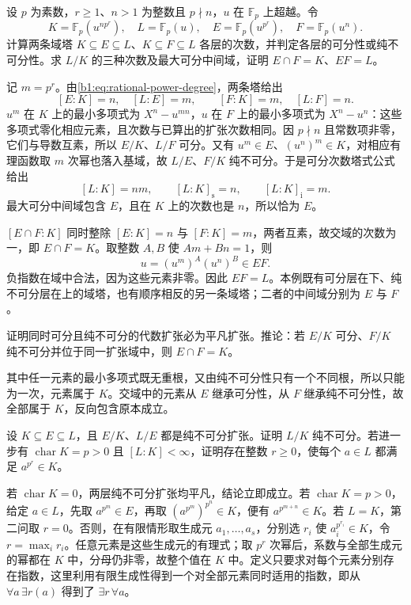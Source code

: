 \begin{exercise}\label{b1:ex:16-4}
	设 \(p\) 为素数，\(r\ge1\)、\(n>1\) 为整数且 \(p\nmid n\)，\(u\) 在 \(\mathbb F_p\) 上超越。令
	\[
		K=\mathbb F_p(u^{np^r}),\quad L=\mathbb F_p(u),\quad E=\mathbb F_p(u^{p^r}),\quad F=\mathbb F_p(u^n).
	\]
	计算两条域塔 \(K\subseteq E\subseteq L\)、\(K\subseteq F\subseteq L\) 各层的次数，并判定各层的可分性或纯不可分性。求 \(L/K\) 的三种次数及最大可分中间域，证明 \(E\cap F=K\)、\(EF=L\)。
\end{exercise}
\begin{solution}
	记 \(m=p^r\)。由\eqref{b1:eq:rational-power-degree}，两条塔给出
	\[
		[E:K]=n,\quad [L:E]=m,\qquad [F:K]=m,\quad [L:F]=n.
	\]
	\(u^m\) 在 \(K\) 上的最小多项式为 \(X^n-u^{mn}\)，\(u\) 在 \(F\) 上的最小多项式为 \(X^n-u^n\)：这些多项式零化相应元素，且次数与已算出的扩张次数相同。因 \(p\nmid n\) 且常数项非零，它们与导数互素，所以 \(E/K\)、\(L/F\) 可分。又有 \(u^m\in E\)、\((u^n)^m\in K\)，对相应有理函数取 \(m\) 次幂也落入基域，故 \(L/E\)、\(F/K\) 纯不可分。于是可分次数塔式公式给出
	\[
		[L:K]=nm,\qquad [L:K]_{\mathrm s}=n,\qquad [L:K]_{\mathrm i}=m.
	\]
	最大可分中间域包含 \(E\)，且在 \(K\) 上的次数也是 \(n\)，所以恰为 \(E\)。

	\([E\cap F:K]\) 同时整除 \([E:K]=n\) 与 \([F:K]=m\)，两者互素，故交域的次数为一，即 \(E\cap F=K\)。取整数 \(A,B\) 使 \(Am+Bn=1\)，则
	\[
		u=(u^m)^A(u^n)^B\in EF.
	\]
	负指数在域中合法，因为这些元素非零。因此 \(EF=L\)。本例既有可分层在下、纯不可分层在上的域塔，也有顺序相反的另一条域塔；二者的中间域分别为 \(E\) 与 \(F\)。
\end{solution}

\begin{exercise}\label{b1:ex:16-5}
	证明同时可分且纯不可分的代数扩张必为平凡扩张。推论：若 \(E/K\) 可分、\(F/K\) 纯不可分并位于同一扩张域中，则 \(E\cap F=K\)。
\end{exercise}
\begin{solution}
	其中任一元素的最小多项式既无重根，又由纯不可分性只有一个不同根，所以只能为一次，元素属于 \(K\)。交域中的元素从 \(E\) 继承可分性，从 \(F\) 继承纯不可分性，故全部属于 \(K\)，反向包含原本成立。
\end{solution}

\begin{exercise}\label{b1:ex:16-6}
	设 \(K\subseteq E\subseteq L\)，且 \(E/K\)、\(L/E\) 都是纯不可分扩张。证明 \(L/K\) 纯不可分。若进一步有 \(\operatorname{char}K=p>0\) 且 \([L:K]<\infty\)，证明存在整数 \(r\geq0\)，使每个 \(a\in L\) 都满足 \(a^{p^r}\in K\)。
\end{exercise}
\begin{solution}
	若 \(\operatorname{char}K=0\)，两层纯不可分扩张均平凡，结论立即成立。若 \(\operatorname{char}K=p>0\)，给定 \(a\in L\)，先取 \(a^{p^m}\in E\)，再取 \((a^{p^m})^{p^n}\in K\)，便有 \(a^{p^{m+n}}\in K\)。若 \(L=K\)，第二问取 \(r=0\)。否则，在有限情形取生成元 \(a_1,\ldots,a_s\)，分别选 \(r_i\) 使 \(a_i^{p^{r_i}}\in K\)，令 \(r=\max_i r_i\)。任意元素是这些生成元的有理式；取 \(p^r\) 次幂后，系数与全部生成元的幂都在 \(K\) 中，分母仍非零，故整个值在 \(K\) 中。定义只要求对每个元素分别存在指数，这里利用有限生成性得到一个对全部元素同时适用的指数，即从 \(\forall a\,\exists r(a)\) 得到了 \(\exists r\,\forall a\)。
\end{solution}

